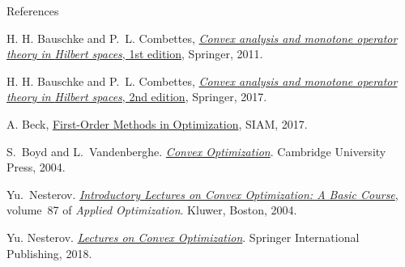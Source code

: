\documentclass[10pt,handout]{beamer}
\begin{document}
\begin{frame}{References}
\begin{thebibliography}{AZQRY16}
    
    H. H. Bauschke and P.~L. Combettes, \href{https://link.springer.com/book/10.1007/978-1-4419-9467-7}{\emph{Convex analysis and monotone
            operator theory in {H}ilbert spaces}, 1st edition}, {S}pringer, 2011.
    
    H. H. Bauschke and P.~L. Combettes, \href{https://link.springer.com/book/10.1007/978-3-319-48311-5}{\emph{Convex analysis and monotone
            operator theory in {H}ilbert spaces}, 2nd edition}, {S}pringer, 2017.
    
    A. Beck, \href{https://epubs.siam.org/doi/book/10.1137/1.9781611974997?mobileUi=0}{First-Order Methods in Optimization}, SIAM, 2017.
    
    S.~Boyd and L.~Vandenberghe.
    \newblock \href{http://www.stanford.edu/~boyd/cvxbook/}{{\em Convex Optimization}}.
    \newblock Cambridge University Press, 2004.
    
    Yu.~Nesterov.
    \newblock \href{https://link.springer.com/book/10.1007/978-1-4419-8853-9}{{\em Introductory Lectures on Convex Optimization: A Basic Course}},
    volume~87 of {\em Applied Optimization}.
    \newblock Kluwer, Boston, 2004.
    
    Yu. Nesterov.
    \newblock \href{https://link.springer.com/book/10.1007/978-3-319-91578-4}{{\em Lectures on Convex Optimization}}.
    \newblock Springer International Publishing, 2018.
    
\end{thebibliography}
    
\end{frame}
\end{document}
